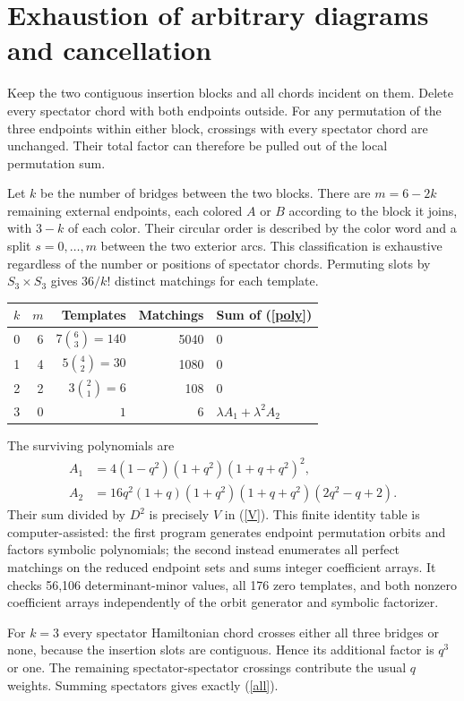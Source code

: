 \documentclass[11pt,a4paper]{article}
\begin{document}
\newpage
\section{Exhaustion of arbitrary diagrams and cancellation}
Keep the two contiguous insertion blocks and all chords incident
on them. Delete every spectator chord with both endpoints outside.
For any permutation of the three endpoints within either block,
crossings with every spectator chord are unchanged. Their total
factor can therefore be pulled out of the local permutation sum.

Let $k$ be the number of bridges between the two blocks. There are
$m=6-2k$ remaining external endpoints, each colored $A$ or $B$
according to the block it joins, with $3-k$ of each color. Their
circular order is described by the color word and a split
$s=0,\ldots,m$ between the two exterior arcs. This classification
is exhaustive regardless of the number or positions of spectator
chords. Permuting slots by $S_3\times S_3$ gives $36/k!$ distinct
matchings for each template.

\begin{center}
\begin{tabular}{rrrrl}
\toprule
$k$ & $m$ & Templates & Matchings & Sum of (\ref{poly})\\
\midrule
0 & 6 & $7\binom63=140$ & 5040 & $0$\\
1 & 4 & $5\binom42=30$ & 1080 & $0$\\
2 & 2 & $3\binom21=6$ & 108 & $0$\\
3 & 0 & $1$ & 6 & $\lambda A_1+\lambda^2 A_2$\\
\bottomrule
\end{tabular}
\end{center}
The surviving polynomials are
\begin{align}
 A_1&=4(1-q^2)(1+q^2)(1+q+q^2)^2,\\
 A_2&=16q^2(1+q)(1+q^2)(1+q+q^2)(2q^2-q+2).
\end{align}
Their sum divided by $D^2$ is precisely $V$ in (\ref{V}).
This finite identity table is computer-assisted: the first program
generates endpoint permutation orbits and factors symbolic
polynomials; the second instead enumerates all perfect matchings
on the reduced endpoint sets and sums integer coefficient arrays.
It checks 56,106 determinant-minor values, all 176 zero templates,
and both nonzero coefficient arrays independently of the orbit
generator and symbolic factorizer.

For $k=3$ every spectator Hamiltonian chord crosses either all
three bridges or none, because the insertion slots are contiguous.
Hence its additional factor is $q^3$ or one. The remaining
spectator-spectator crossings contribute the usual $q$ weights.
Summing spectators gives exactly (\ref{all}).
\end{document}
